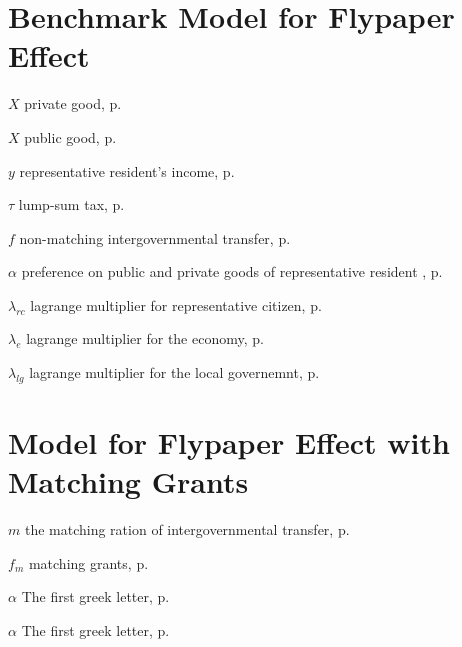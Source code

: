 \begin{eqlist}
    \section*{Benchmark Model for Flypaper Effect}

    \item[$X$]
    private good, p.~\pageref{G}

    \item[$X$]
    public good, p.~\pageref{X}

    \item[$y$]
    representative resident's income, p.~\pageref{y}

    \item[$\tau$]
    lump-sum tax, p.~\pageref{y}

    \item[$f$]
    non-matching intergovernmental transfer, p.~\pageref{f}

    \item[$\alpha$]
    preference on public and private goods of representative resident , p.~\pageref{bmrcutility}

    \item[$\lambda_{rc}$]
    lagrange multiplier for representative citizen, p.~\pageref{bmrclagrangian}

    \item[$\lambda_{e}$]
    lagrange multiplier for the economy, p.~\pageref{bmeclagrangian}

    \item[$\lambda_{lg}$]
    lagrange multiplier for the local governemnt, p.~\pageref{bmeclagrangian}

    \section*{ Model for Flypaper Effect with Matching Grants}
    \item[$m$]
    the matching ration of intergovernmental transfer, p.~\pageref{mr}

    \item[$f_m$]
    matching grants, p.~\pageref{mr}

    \item[$\alpha$]
    The first greek letter, p.~\pageref{ChX-figure: FigureLabel3}

    \item[$\alpha$]
    The first greek letter, p.~\pageref{ChX-figure: FigureLabel4}


\end{eqlist}
